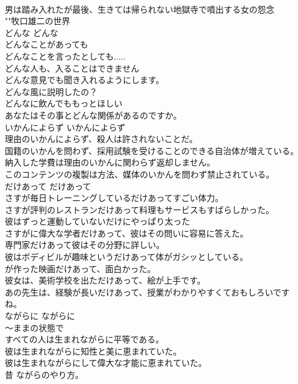 \documentclass[8pt]{extreport}
\begin{document}
\begin{CJK}{UTF8}{min}
\\	男は踏み入れたが最後、生きては帰られない地獄寺で噴出する女の怨念  
\\	""牧口雄二の世界
\\	どんな	どんな	
\\	どんなことがあっても  
\\	どんなことを言ったとしても.....  
\\	どんな人も、入ることはできません  
\\	どんな意見でも聞き入れるようにします。  
\\	どんな風に説明したの？  
\\	どんなに飲んでももっとほしい  
\\	あなたはその事とどんな関係があるのですか。  
\\	いかんによらず	いかんによらず	
\\	理由のいかんによらず、殺人は許されないことだ。  
\\	国籍のいかんを問わず、採用試験を受けることのできる自治体が増えている。  
\\	納入した学費は理由のいかんに関わらず返却しません。  
\\	このコンテンツの複製は方法、媒体のいかんを問わず禁止されている。  
\\	だけあって	だけあって	
\\	さすが毎日トレーニングしているだけあってすごい体力。  
\\	さすが評判のレストランだけあって料理もサービスもすばらしかった。  
\\	彼はずっと運動していないだけにやっぱり太った  
\\	さすがに偉大な学者だけあって、彼はその問いに容易に答えた。  
\\	専門家だけあって彼はその分野に詳しい。  
\\	彼はボディビルが趣味というだけあって体がガシッとしている。  
\\	が作った映画だけあって、面白かった。   
\\	彼女は、美術学校を出ただけあって、絵が上手です。  
\\	あの先生は、経験が長いだけあって、授業がわかりやすくておもしろいですね。  
\\	ながらに	ながらに	
\\	〜ままの状態で	
\\	すべての人は生まれながらに平等である。  
\\	彼は生まれながらに知性と美に恵まれていた。  
\\	彼は生まれながらにして偉大な才能に恵まれていた。  
\\	昔 ながらのやり方。  

\end{CJK}
\end{document}
